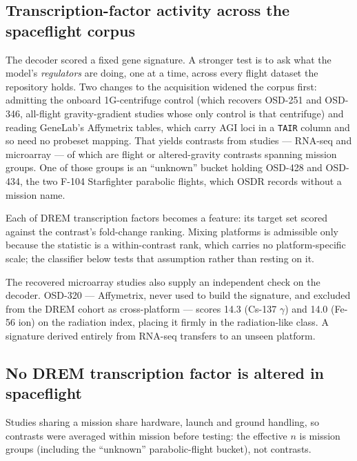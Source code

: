 \subsection{Transcription-factor activity across the spaceflight corpus}

The decoder scored a fixed gene signature. A stronger test is to ask what the model's
\emph{regulators} are doing, one at a time, across every flight dataset the repository
holds. Two changes to the acquisition widened the corpus first: admitting the onboard
1G-centrifuge control (which recovers OSD-251 and OSD-346, all-flight gravity-gradient
studies whose only control is that centrifuge) and reading GeneLab's Affymetrix tables, which carry AGI
loci in a \texttt{TAIR} column and so need no probeset mapping. That yields
\NumTFContrasts{} contrasts from \NumTFStudies{} studies ---
\NumRnaSeqContrasts{} RNA-seq and \NumMicroarrayContrasts{} microarray --- of which
\NumFlightContrasts{} are flight or altered-gravity contrasts spanning
\NumMissions{} mission groups. One of those groups is an ``unknown'' bucket holding
OSD-428 and OSD-434, the two F-104 Starfighter parabolic flights, which OSDR records
without a mission name.

Each of \NumTFFeatures{} DREM transcription factors becomes a feature: its target set
scored against the contrast's fold-change ranking. Mixing platforms is admissible only
because the statistic is a within-contrast rank, which carries no platform-specific scale;
the classifier below tests that assumption rather than resting on it.

The recovered microarray studies also supply an independent check on the decoder. OSD-320
--- Affymetrix, never used to build the signature, and excluded from the DREM cohort as
cross-platform --- scores 14.3 (Cs-137 $\gamma$) and 14.0 (Fe-56 ion) on the radiation
index, placing it firmly in the radiation-like class. A signature derived entirely from
RNA-seq transfers to an unseen platform.

\subsection{No DREM transcription factor is altered in spaceflight}

Studies sharing a mission share hardware, launch and ground handling, so contrasts were
averaged within mission before testing: the effective $n$ is \NumMissionObservations{}
mission groups (including the ``unknown'' parabolic-flight bucket), not
\NumFlightContrasts{} contrasts.

